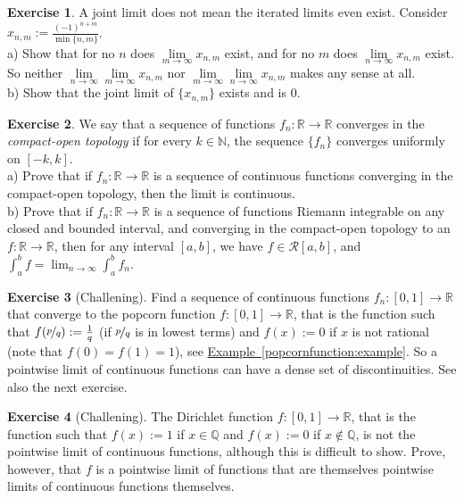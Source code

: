 \documentclass[12pt]{book}
\newcommand{\R}{{\mathbb{R}}}
\newcommand{\N}{{\mathbb{N}}}
\newcommand{\Q}{{\mathbb{Q}}}
\newcommand{\sR}{{\mathcal{R}}}
\newcommand{\myindex}[1]{#1\index{#1}}
\theoremstyle{plain}
\theoremstyle{remark}
\theoremstyle{definition}
\theoremstyle{exercise}
\newtheorem{exercise}{Exercise}[section]
\theoremstyle{example}
\newcommand{\exampleref}[1]{\hyperref[#1]{Example~\ref*{#1}}}
\begin{document}
\begin{exercise}
A joint limit does not mean the iterated limits even exist.
Consider $x_{n,m} := \frac{{(-1)}^{n+m}}{\min \{n,m \}}$.\\
a) Show that for no $n$ does
$\lim\limits_{m \to \infty} x_{n,m}$ exist, and for no $m$
does 
$\lim\limits_{n \to \infty} x_{n,m}$ exist.  So neither
$\lim\limits_{n\to\infty}\lim\limits_{m \to \infty} x_{n,m}$ nor
$\lim\limits_{m\to\infty}\lim\limits_{n \to \infty} x_{n,m}$ makes any sense
at all.\\
b) Show that the joint limit of $\{ x_{n,m} \}$ exists and is 0.
\end{exercise}

\begin{exercise}
We say that a sequence of functions $f_n \colon \R \to \R$ converges
in the \emph{\myindex{compact-open topology}} if for every $k \in \N$,
the sequence $\{ f_n \}$ converges uniformly on $[-k,k]$.
\\
a) Prove that if $f_n \colon \R \to \R$ is a sequence of
continuous functions converging in the compact-open topology, then
the limit is continuous.
\\
b) 
Prove that if $f_n \colon \R \to \R$ is a sequence of
functions Riemann integrable on any closed and bounded interval,
and converging in the compact-open topology to an $f \colon \R \to \R$,
then for any interval $[a,b]$, we have $f \in \sR[a,b]$, and
$\int_a^b f = \lim_{n\to\infty} \int_a^b f_n$.
\end{exercise}

\begin{exercise}[Challening]
Find a sequence of continuous functions $f_n \colon [0,1] \to \R$ that
converge to the popcorn function $f \colon [0,1] \to \R$, that is the
function such that $f(\nicefrac{p}{q}) := \frac{1}{q}$ (if $\nicefrac{p}{q}$
is in lowest terms) and $f(x) := 0$ if $x$ is not rational (note
that $f(0) = f(1) = 1$),
see \exampleref{popcornfunction:example}.
So a pointwise limit of continuous functions can have a dense set of
discontinuities.  See also the next exercise.
\end{exercise}

\begin{exercise}[Challening]
The Dirichlet function
$f \colon [0,1] \to \R$, that is the
function such that $f(x) := 1$ if $x \in \Q$
and $f(x) := 0$ if $x \notin \Q$,
is not the pointwise limit of
continuous functions, although this is difficult to show.
Prove, however, that $f$ is a pointwise limit of functions that are themselves
pointwise limits of
continuous functions themselves.
\end{exercise}
\end{document}
